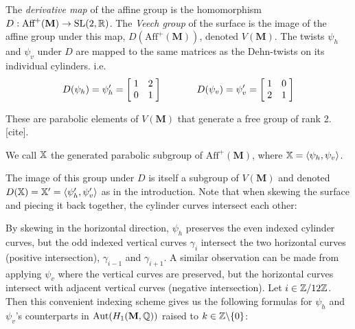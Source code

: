 \documentclass[]{article}
\def\bM{\mathbf{M}}
\def\<{\langle} \def\>{\rangle}
\def\Aut{\mathrm{Aut}}
\begin{document}
The \emph{derivative map} of the affine group is the homomorphism $D:\text{Aff}^+(\bM)\rightarrow \SL(2,\RR)$. The \emph{Veech group} of the surface is the image of the affine group under this map, $D(\text{Aff}^+(\bM))$, denoted $V(\bM)$.
The twists $\psi_h$ and $\psi_v$ under $D$ are mapped to the same matrices as the Dehn-twists on its individual cylinders. i.e.
\begin{align*}
D(\psi_h)=\psi_h'=\left[ \hspace{1mm} \begin{matrix}
				1 &   2\\
				0 & 1
			\end{matrix}\hspace{1mm}\right] \hspace{0.5in}
			D(\psi_v)=\psi_v'=\left[ \hspace{1mm} \begin{matrix}
							1 & 0\\
							 2 & 1
						\end{matrix}\hspace{1mm}\right]
\end{align*}

These are parabolic elements of $V(\bM)$ that generate a free group of rank 2. [cite].
\begin{Def}
We call $\mathbb{X}$ the generated parabolic subgroup of $\text{Aff}^+(\bM)$, where $\XX=\<\psi_h,\psi_v \>$.
\end{Def}

The image of this group under $D$ is itself a subgroup of $V(\bM)$ and denoted $D(\XX)=\XX'=\<\psi_h',\psi_v' \>$ as in the introduction. Note that when skewing the surface and piecing it back together, the cylinder curves intersect each other:

\begin{figure}[H]
\centering

\end{figure}

By skewing in the horizontal direction, $\psi_h$ preserves the even indexed cylinder curves, but the odd indexed vertical curves $\gamma_i$ intersect the two horizontal curves (positive intersection), $\gamma_{i-1}$ and $\gamma_{i+1}$. A similar observation can be made from applying $\psi_v$ where the vertical curves are preserved, but the horizontal curves intersect with adjacent vertical curves (negative intersection). Let $i\in\mathbb{Z}/12\mathbb{Z}$. Then this convenient indexing scheme gives us the following formulas for $\psi_h$ and $\psi_v$'s counterparts in $\Aut(H_1(\bM,\QQ))$ raised to $k\in\mathbb{Z}\backslash\{0\}$:
\end{document}
